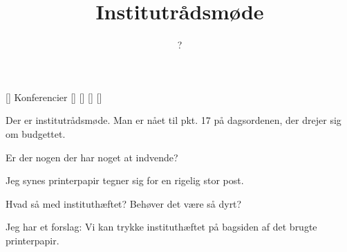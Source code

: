 \documentclass[a4paper,11pt]{article}
\title{Institutrådsmøde}
\author{?}
\begin{document}
\maketitle

\begin{roles}
[] Konferencier
[]
[]
[]
[]
\end{roles}

\begin{sketch}

   Der er institutrådsmøde.  Man er nået til pkt. 17 på
  dagsordenen, der drejer sig om budgettet.

   Er der nogen der har noget at indvende?

   Jeg synes printerpapir tegner sig for en rigelig stor post.

   Hvad så med instituthæftet?  Behøver det være så dyrt?

   Jeg har et forslag: Vi kan trykke instituthæftet på
  bagsiden af det brugte printerpapir.

\end{sketch}
\end{document}
